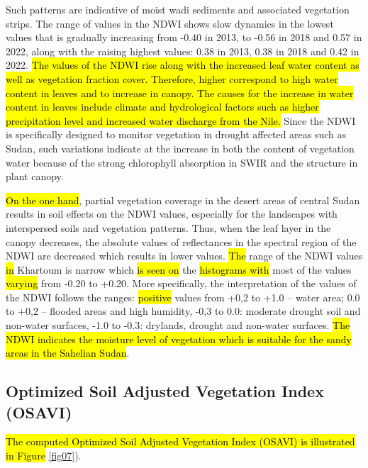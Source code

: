\documentclass[jimaging,article,submit,pdftex,moreauthors]{Definitions/mdpi}
\begin{document}
Such patterns are indicative of moist wadi sediments and associated vegetation strips. The range of values in the NDWI shows slow dynamics in the lowest values that is gradually increasing from -0.40 in 2013, to -0.56 in 2018 and 0.57 in 2022, along with the raising highest values: 0.38 in 2013, 0.38 in 2018 and 0.42 in 2022. \hl{The values of the NDWI rise along with the increased leaf water content as well as vegetation fraction cover. Therefore, higher correspond to high water content in leaves and to increase in canopy. The causes for the increase in water content in leaves include climate and hydrological factors such as higher precipitation level and increased water discharge from the Nile. }Since the NDWI is specifically designed to monitor vegetation in drought affected areas such as Sudan, such variations indicate at the increase in both the content of vegetation water because of the strong chlorophyll absorption in SWIR and the structure in plant canopy. 

\hl{On the one hand}, partial vegetation coverage in the desert areas of central Sudan results in soil effects on the NDWI values, especially for the landscapes with interspersed soils and vegetation patterns. Thus, when the leaf layer in the canopy decreases, the absolute values of reflectances in the spectral region of the NDWI are decreased which results in lower values. \hl{The} range of the NDWI values \hl{in} Khartoum is narrow which \hl{is seen on} the \hl{histograms with} most of the values \hl{varying} from -0.20 to +0.20. More specifically, the interpretation of the values of the NDWI follows the ranges: \hl{positive} values from +0,2 to +1.0 -- water area; 0.0 to +0,2 -- flooded areas and high humidity, -0,3 to 0.0: moderate drought soil and non-water surfaces, -1.0 to -0.3: drylands, drought and non-water surfaces. \hl{The NDWI indicates the moisture level of vegetation which is suitable for the sandy areas in the Sahelian Sudan}.

\subsection{Optimized Soil Adjusted Vegetation Index (OSAVI)}

\hl{The computed Optimized Soil Adjusted Vegetation Index (OSAVI) is illustrated in Figure} \ref{fig07}). 
\end{document}
